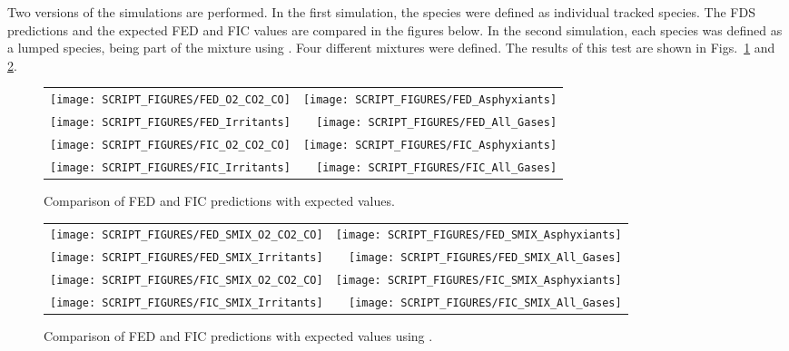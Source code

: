 \documentclass[11pt]{book}
\begin{document}
Two versions of the simulations are performed. In the first simulation, the species were defined as individual tracked species.
The FDS predictions and the expected FED and FIC values are compared in the figures below. In the second simulation, each species was defined as
a lumped species, being part of the mixture using . Four different mixtures were defined. The results of this test are shown in
Figs.~\ref{FED_FIC_plot} and \ref{FED_FIC_SMIX_plot}.

\begin{figure}[ht]
\noindent
\begin{tabular*}{\textwidth}{l@{\extracolsep{\fill}}r}
\texttt{[image: SCRIPT\_FIGURES/FED\_O2\_CO2\_CO]} &
\texttt{[image: SCRIPT\_FIGURES/FED\_Asphyxiants]} \\
\texttt{[image: SCRIPT\_FIGURES/FED\_Irritants]} &
\texttt{[image: SCRIPT\_FIGURES/FED\_All\_Gases]} \\
\texttt{[image: SCRIPT\_FIGURES/FIC\_O2\_CO2\_CO]} &
\texttt{[image: SCRIPT\_FIGURES/FIC\_Asphyxiants]} \\
\texttt{[image: SCRIPT\_FIGURES/FIC\_Irritants]} &
\texttt{[image: SCRIPT\_FIGURES/FIC\_All\_Gases]}
\end{tabular*}
\caption[The FED and FIC values in  test cases]{Comparison of FED and FIC predictions with expected values.}
\label{FED_FIC_plot}
\end{figure}

\begin{figure}[ht]
\noindent
\begin{tabular*}{\textwidth}{l@{\extracolsep{\fill}}r}
\texttt{[image: SCRIPT\_FIGURES/FED\_SMIX\_O2\_CO2\_CO]} &
\texttt{[image: SCRIPT\_FIGURES/FED\_SMIX\_Asphyxiants]} \\
\texttt{[image: SCRIPT\_FIGURES/FED\_SMIX\_Irritants]} &
\texttt{[image: SCRIPT\_FIGURES/FED\_SMIX\_All\_Gases]} \\
\texttt{[image: SCRIPT\_FIGURES/FIC\_SMIX\_O2\_CO2\_CO]} &
\texttt{[image: SCRIPT\_FIGURES/FIC\_SMIX\_Asphyxiants]} \\
\texttt{[image: SCRIPT\_FIGURES/FIC\_SMIX\_Irritants]} &
\texttt{[image: SCRIPT\_FIGURES/FIC\_SMIX\_All\_Gases]}
\end{tabular*}
\caption[The FED and FIC values in  test cases]{Comparison of FED and FIC predictions with expected values using .}
\label{FED_FIC_SMIX_plot}
\end{figure}

\clearpage
\end{document}

